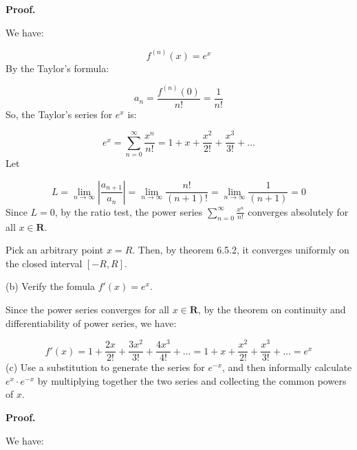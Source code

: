 \documentclass[10pt]{article}
\begin{document}
\textbf{Proof.}



We have:


\begin{equation*}
f^{( n)}( x) =e^{x}
\end{equation*}
By the Taylor's formula:


\begin{equation*}
a_{n} =\frac{f^{( n)}( 0)}{n!} =\frac{1}{n!}
\end{equation*}
So, the Taylor's series for $\displaystyle e^{x}$ is:


\begin{equation*}
e^{x} =\sum _{n=0}^{\infty }\frac{x^{n}}{n!} =1+x+\frac{x^{2}}{2!} +\frac{x^{3}}{3!} +\dotsc 
\end{equation*}
Let


\begin{equation*}
L=\lim _{n\rightarrow \infty }\left| \frac{a_{n+1}}{a_{n}}\right| =\lim _{n\rightarrow \infty }\frac{n!}{( n+1) !} =\lim _{n\rightarrow \infty }\frac{1}{( n+1)} =0
\end{equation*}
Since $\displaystyle L=0$, by the ratio test, the power series $\displaystyle \sum _{n=0}^{\infty }\frac{x^{n}}{n!}$ converges absolutely for all $\displaystyle x\in \mathbf{R}$. 

Pick an arbitrary point $\displaystyle x=R$. Then, by theorem 6.5.2, it converges uniformly on the closed interval $\displaystyle [ -R,R]$. 



(b) Verify the fomula $\displaystyle f'( x) =e^{x}$. 



Since the power series converges for all $\displaystyle x\in \mathbf{R}$, by the theorem on continuity and differentiability of power series, we have:


\begin{equation*}
f'( x) =1+\frac{2x}{2!} +\frac{3x^{2}}{3!} +\frac{4x^{3}}{4!} +\dotsc =1+x+\frac{x^{2}}{2!} +\frac{x^{3}}{3!} +\dotsc =e^{x}
\end{equation*}
(c) Use a substitution to generate the series for $\displaystyle e^{-x}$, and then informally calculate $\displaystyle e^{x} \cdot e^{-x}$ by multiplying together the two series and collecting the common powers of $\displaystyle x$.



\textbf{Proof.}



We have:
\end{document}

